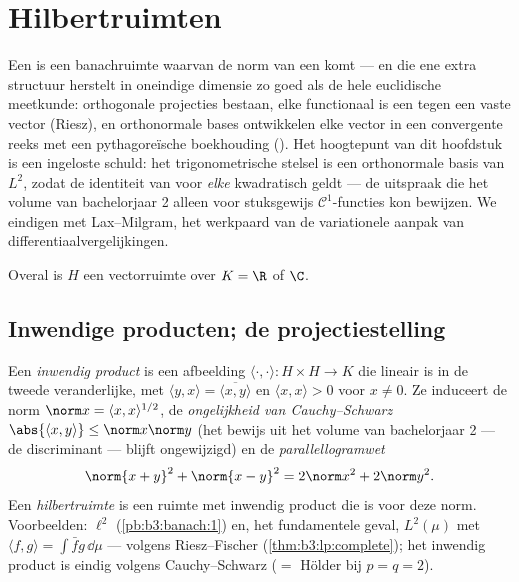 \chapter{Hilbertruimten}\label{ch:b3:hilbert}

Een  is een banachruimte waarvan de norm van een
 komt --- en die ene extra structuur herstelt in
oneindige dimensie zo goed als de hele euclidische meetkunde:
orthogonale projecties bestaan, elke  functionaal is een
 tegen een vaste vector (Riesz), en orthonormale
bases ontwikkelen elke vector in een convergente reeks met een
pythagoreïsche boekhouding (). Het hoogtepunt van dit
hoofdstuk is een ingeloste schuld: het trigonometrische stelsel
is een orthonormale basis van $L^2$, zodat de identiteit van
 voor \emph{elke} kwadratisch 
geldt --- de uitspraak die het volume van bachelorjaar 2 alleen
voor stuksgewijs $\mathcal C^1$-functies kon bewijzen. We
eindigen met Lax--Milgram, het werkpaard van de variationele
aanpak van differentiaalvergelijkingen.

Overal is $H$ een vectorruimte over $K = \R$ of $\C$.

\section{Inwendige producten; de projectiestelling}

\begin{definition}\label{def:b3:hilbert:inner}
Een \emph{inwendig product} is een
afbeelding $\langle \cdot,\cdot\rangle \colon H\times H \to K$
die lineair is in de tweede veranderlijke, met $\langle y,
x\rangle = \overline{\langle x, y\rangle}$ en $\langle x,
x\rangle > 0$ voor $x \neq 0$. Ze induceert de norm $\norm x =
\langle x, x\rangle^{1/2}$, de \emph{ongelijkheid van
Cauchy--Schwarz} $\abs{\langle x, y\rangle} \leq \norm x\norm y$
(het bewijs uit het volume van bachelorjaar 2 --- de
discriminant --- blijft ongewijzigd) en de
\emph{parallellogramwet}
\[
\norm{x + y}^2 + \norm{x - y}^2 = 2\norm x^2 + 2\norm y^2 .
\]
Een \emph{hilbertruimte} is een ruimte met
inwendig product die  is voor deze norm. Voorbeelden:
$\ell^2$ (\cref{pb:b3:banach:1}) en, het fundamentele geval,
$L^2(\mu)$ met $\langle f, g\rangle = \int\bar fg\,\dd\mu$ ---
 volgens Riesz--Fischer (\cref{thm:b3:lp:complete}); het
inwendig product is eindig volgens Cauchy--Schwarz ($=$ Hölder
bij $p = q = 2$).
\end{definition}

